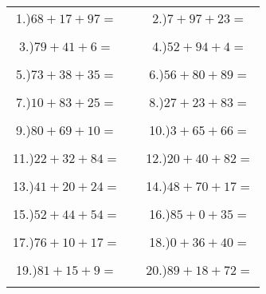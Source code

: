 \documentclass{article}
\begin{document}
\begin{tabular}{ccc}
1.)$68+17+97=$& \hspace{5cm} &2.)$7+97+23=$\\\\
3.)$79+41+6=$& \hspace{5cm} &4.)$52+94+4=$\\\\
5.)$73+38+35=$& \hspace{5cm} &6.)$56+80+89=$\\\\
7.)$10+83+25=$& \hspace{5cm} &8.)$27+23+83=$\\\\
9.)$80+69+10=$& \hspace{5cm} &10.)$3+65+66=$\\\\
11.)$22+32+84=$& \hspace{5cm} &12.)$20+40+82=$\\\\
13.)$41+20+24=$& \hspace{5cm} &14.)$48+70+17=$\\\\
15.)$52+44+54=$& \hspace{5cm} &16.)$85+0+35=$\\\\
17.)$76+10+17=$& \hspace{5cm} &18.)$0+36+40=$\\\\
19.)$81+15+9=$& \hspace{5cm} &20.)$89+18+72=$\\\\
\end{tabular}
\newpage
\end{document}
